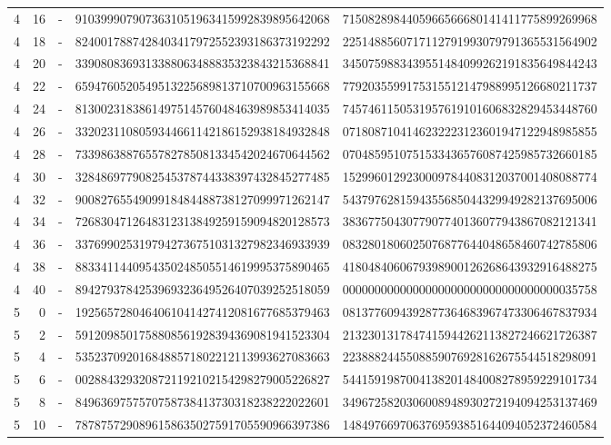 \begin{longtable}{rrrll}
4 & 16 & - & 9103999079073631051963415992839895642068 & 7150828984405966566680141411775899269968 \\
4 & 18 & - & 8240017887428403417972552393186373192292 & 2251488560717112791993079791365531564902 \\
4 & 20 & - & 3390808369313388063488835323843215368841 & 3450759883439551484099262191835649844243 \\
4 & 22 & - & 6594760520549513225689813710700963155668 & 7792035599175315512147988995126680211737 \\
4 & 24 & - & 8130023183861497514576048463989853414035 & 7457461150531957619101606832829453448760 \\
4 & 26 & - & 3320231108059344661142186152938184932848 & 0718087104146232223123601947122948985855 \\
4 & 28 & - & 7339863887655782785081334542024670644562 & 0704859510751533436576087425985732660185 \\
4 & 30 & - & 3284869779082545378744338397432845277485 & 1529960129230009784408312037001408088774 \\
4 & 32 & - & 9008276554909918484488738127099971262147 & 5437976281594355685044329949282137695006 \\
4 & 34 & - & 7268304712648312313849259159094820128573 & 3836775043077907740136077943867082121341 \\
4 & 36 & - & 3376990253197942736751031327982346933939 & 0832801806025076877644048658460742785806 \\
4 & 38 & - & 8833411440954350248505514619995375890465 & 4180484060679398900126268643932916488275 \\
4 & 40 & - & 8942793784253969323649526407039252518059 & 0000000000000000000000000000000000035758 \\
5 & 0 & - & 1925657280464061041427412081677685379463 & 0813776094392877364683967473306467837934 \\
5 & 2 & - & 5912098501758808561928394369081941523304 & 2132301317847415944262113827246621726387 \\
5 & 4 & - & 5352370920168488571802212113993627083663 & 2238882445508859076928162675544518298091 \\
5 & 6 & - & 0028843293208721192102154298279005226827 & 5441591987004138201484008278959229101734 \\
5 & 8 & - & 8496369757570758738413730318238222022601 & 3496725820306008948930272194094253137469 \\
5 & 10 & - & 7878757290896158635027591705590966397386 & 1484976697063769593851644094052372460584 \\

\end{longtable}
